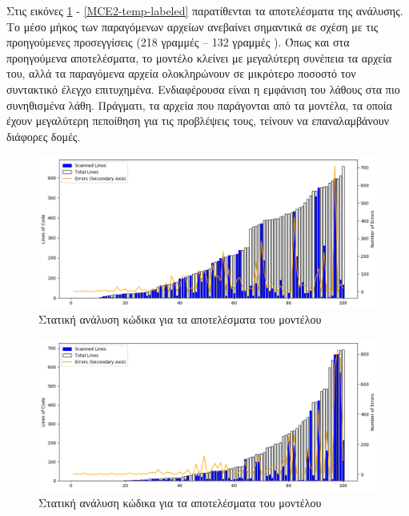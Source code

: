 Στις εικόνες \ref{static-temp-char} - \ref{MCE2-temp-labeled} παρατίθενται τα αποτελέσματα της ανάλυσης.
Το μέσο μήκος των παραγόμενων αρχείων ανεβαίνει σημαντικά σε σχέση με τις προηγούμενες προσεγγίσεις (218 γραμμές  -- 132 γραμμές ).
Όπως και στα προηγούμενα αποτελέσματα, το μοντέλο  κλείνει με μεγαλύτερη συνέπεια τα αρχεία του, αλλά τα παραγόμενα αρχεία ολοκληρώνουν σε μικρότερο ποσοστό τον συντακτικό έλεγχο επιτυχημένα.
Ενδιαφέρουσα είναι η εμφάνιση του λάθους  στα πιο συνηθισμένα λάθη.
Πράγματι, τα αρχεία που παράγονται από τα μοντέλα, τα οποία έχουν μεγαλύτερη πεποίθηση για τις προβλέψεις τους, τείνουν να επαναλαμβάνουν διάφορες δομές.

\begin{figure}
	\includegraphics[width=\textwidth, keepaspectratio]{images/temp-char.png}
	\caption{Στατική ανάλυση κώδικα για τα αποτελέσματα του  μοντέλου}
	\label{static-temp-char}
\end{figure}

\begin{figure}
	\includegraphics[width=\textwidth, keepaspectratio]{images/temp-labeled.png}
	\caption{Στατική ανάλυση κώδικα για τα αποτελέσματα του  μοντέλου}
	\label{static-temp-labeled}
\end{figure}

